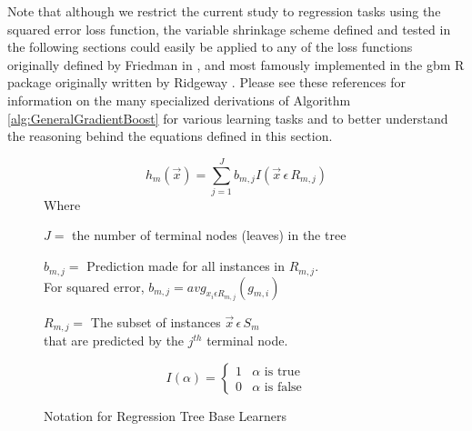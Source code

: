\documentclass[9pt, conference]{IEEEtran}
\begin{document}
Note that although we restrict the current study to regression tasks using the squared error loss function, the variable shrinkage scheme defined and tested in the following sections could easily be applied to any of the loss functions originally defined by Friedman in \cite{2001Friedman} \cite{2002Friedman}, and most famously implemented in the gbm R package originally written by Ridgeway \cite{2012ridgeway}. Please see these references for information on the many specialized derivations of Algorithm \ref{alg:GeneralGradientBoost} for various learning tasks and to better understand the reasoning behind the equations defined in this section.
\begin{figure}[t]
	
	\begin{equation}
	h_m(\vec{x}) = \sum_{j=1}^{J}b_{m,j}I(\vec{x} \, \epsilon \, R_{m,j})
	\end{equation}
	Where 
	\begin{center}
		\(J =\) the number of terminal nodes (leaves) in the tree 
	\end{center}
	\begin{center}
		\(b_{m,j} =\) Prediction made for all instances in \(R_{m,j}\).\\ 
		For squared error, \(b_{m,j} =  avg_{x_i \epsilon R_{m,j}}( g_{m, i}) \) 
	\end{center}
	\begin{center}
		\(R_{m,j} = \) The subset of instances \(\vec{x} \, \epsilon \, S_m\) \\
		that are predicted by the \(j^{th}\) terminal node.
	\end{center}
	
	\[ I(\alpha) = \begin{cases} 
	1 & \alpha \text{ is true} \\
	0 & \alpha \text{ is false}  
	\end{cases}
	\]
	\caption{Notation for Regression Tree Base Learners}
	\label{fig:regressionTreeFig}
\end{figure}	
\end{document}
